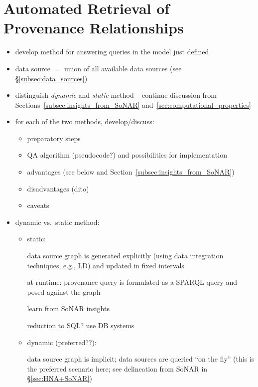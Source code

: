 \chapter{Automated Retrieval of Provenance Relationships}
\label{chap:retrieval}

\begin{itemize}
  \item
    develop method for answering queries in the model just defined
  \item
    data source $=$ union of all available data sources (see §\ref{subsec:data_sources})
  \item
    distinguish \emph{dynamic} and \emph{static} method -- continue discussion
    from Sections~\ref{subsec:insights_from_SoNAR} and~\ref{sec:computational_properties}
  \item
    for each of the two methods, develop/discuss:
    \begin{itemize}
      \item
        preparatory steps
      \item
        QA algorithm (pseudocode?) and possibilities for implementation
      \item
        advantages (see below and Section~\ref{subsec:insights_from_SoNAR})
      \item
        disadvantages (dito)
      \item
        caveats
    \end{itemize}
  \item
    dynamic vs.\ static method:
    \begin{itemize}
      \item
        static: 
        
        data source graph is generated explicitly (using data integration techniques, e.g., LD)
        and updated in fixed intervals
                
        at runtime: provenance query is formulated as a \gls{SPARQL} query and posed against the graph
        
        learn from SoNAR insights
        
        reduction to SQL? use DB systems
      \item
        dynamic (preferred??):
        
        data source graph is implicit; data sources are queried \enquote{on the fly}
        (this is the preferred scenario here; see delineation from SoNAR in §\ref{sec:HNA+SoNAR})
        

\end{itemize}
\end{itemize}

